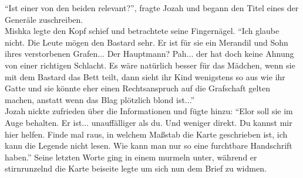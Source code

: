 ``Ist einer von den beiden relevant?'', fragte Jozah und begann den Titel eines der Generäle 
zuschreiben.\\
Mishka legte den Kopf schief und betrachtete seine Fingernägel. ``Ich glaube nicht. Die Leute mögen 
den Bastard sehr. Er ist für sie ein Merandil und Sohn ihres verstorbenen Grafen... Der Hauptmann? 
Pah... der hat doch keine Ahnung von einer richtigen Schlacht. Es wäre natürlich besser für das 
Mädchen, wenn sie mit dem Bastard das Bett teilt, dann sieht ihr Kind wenigstens so aus wie ihr 
Gatte und sie könnte eher einen Rechtsanspruch auf die Grafschaft gelten machen, anstatt wenn das 
Blag plötzlich blond ist...''\\
Jozah nickte zufrieden über die Informationen und fügte hinzu: ``Elor soll sie im Auge behalten. Er 
ist... unauffälliger als du. Und weniger direkt. Du kannst mir hier helfen. Finde mal raus, in 
welchem Maßstab die Karte geschrieben ist, ich kann die Legende nicht lesen. Wie kann man nur so 
eine furchtbare Handschrift haben.'' Seine letzten Worte ging in einem murmeln unter, während er 
stirnrunzelnd die Karte beiseite legte um sich nun dem Brief zu widmen.\\

